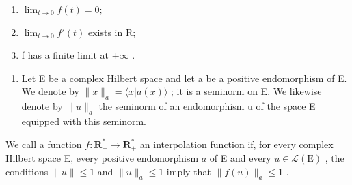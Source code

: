 \begin{enumerate}
\def\labelenumi{(\roman{enumi})}
\item
  \(\lim_{t\to0}f(t)=0;\)
\item
  \(\lim_{t\to0}f'(t)\) exists in R;
\item
  f has a finite limit at \(+\infty\) .
\end{enumerate}

\begin{enumerate}
\def\labelenumi{\arabic{enumi})}
\setcounter{enumi}{25}
\tightlist
\item
  Let E be a complex Hilbert space and let a be a positive endomorphism of E. We denote by \(\|x\|_{a} = \langle x | a(x) \rangle\) ; it is a seminorm on E. We likewise denote by \(\|u\|_{a}\) the seminorm of an endomorphism u of the space E equipped with this seminorm.
\end{enumerate}

We call a function \(f \colon \mathbf{R}_+^* \to \mathbf{R}_+^*\) an interpolation function if, for every complex Hilbert space E, every positive endomorphism \(a\) of E and every \(u \in \mathcal{L}(\mathrm{E})\) , the conditions \(\| u \| \leqslant 1\) and \(\| u \|_a \leqslant 1\) imply that \(\| f(u) \|_a \leqslant 1\) .

